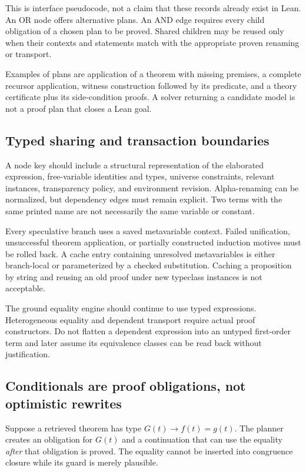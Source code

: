 \documentclass[11pt,letterpaper]{article}
\theoremstyle{definition}\newtheorem{definition}[theorem]{Definition}
\theoremstyle{remark}\newtheorem{remark}[theorem]{Remark}
\begin{document}
This is interface pseudocode, not a claim that these records already exist in Lean. An OR node offers alternative plans. An AND edge requires every child obligation of a chosen plan to be proved. Shared children may be reused only when their contexts and statements match with the appropriate proven renaming or transport.

Examples of plans are application of a theorem with missing premises, a complete recursor application, witness construction followed by its predicate, and a theory certificate plus its side-condition proofs. A solver returning a candidate model is not a proof plan that closes a Lean goal.

\subsection{Typed sharing and transaction boundaries}
A node key should include a structural representation of the elaborated expression, free-variable identities and types, universe constraints, relevant instances, transparency policy, and environment revision. Alpha-renaming can be normalized, but dependency edges must remain explicit. Two terms with the same printed name are not necessarily the same variable or constant.

Every speculative branch uses a saved metavariable context. Failed unification, unsuccessful theorem application, or partially constructed induction motives must be rolled back. A cache entry containing unresolved metavariables is either branch-local or parameterized by a checked substitution. Caching a proposition by string and reusing an old proof under new typeclass instances is not acceptable.

The ground equality engine should continue to use typed expressions. Heterogeneous equality and dependent transport require actual proof constructors. Do not flatten a dependent expression into an untyped first-order term and later assume its equivalence classes can be read back without justification.

\subsection{Conditionals are proof obligations, not optimistic rewrites}
Suppose a retrieved theorem has type $G(t)\to f(t)=g(t)$. The planner creates an obligation for $G(t)$ and a continuation that can use the equality \emph{after} that obligation is proved. The equality cannot be inserted into congruence closure while its guard is merely plausible.
\end{document}
